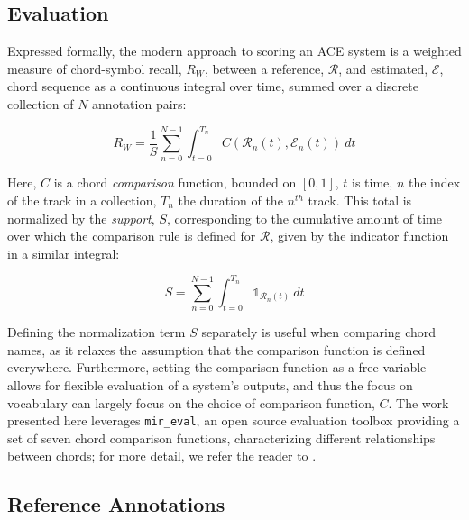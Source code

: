 \documentclass{article}
\begin{document}
\subsection{Evaluation}
\label{subsec:eval}

Expressed formally, the modern approach to scoring an ACE system is a weighted measure of chord-symbol recall, $R_{W}$, between a reference, $\mathcal{R}$, and estimated, $\mathcal{E}$, chord sequence as a continuous integral over time, summed over a discrete collection of $N$ annotation pairs:

\begin{equation}
\label{eq:recall_micro}
R_{W} = \frac{1}{S}\sum_{n=0}^{N-1}\int_{t=0}^{T_n}C(\mathcal{R}_n(t), \mathcal{E}_n(t))~dt
\end{equation}

\noindent Here, $C$ is a chord \emph{comparison} function, bounded on $[0, 1]$, $t$ is time, $n$ the index of the track in a collection, $T_n$ the duration of the $n^{th}$ track. This total is normalized by the \emph{support}, $S$, corresponding to the cumulative amount of time over which the comparison rule is defined for $\mathcal{R}$, given by the indicator function in a similar integral:

\begin{equation}
S = \sum_{n=0}^{N-1}\int_{t=0}^{T_n}\mathds{1}_{\mathcal{R}_n(t)}~dt
\end{equation}

Defining the normalization term $S$ separately is useful when comparing chord names, as it relaxes the assumption that the comparison function is defined everywhere.
Furthermore, setting the comparison function as a free variable allows for flexible evaluation of a system's outputs, and thus the focus on vocabulary can largely focus on the choice of comparison function, $C$.
The work presented here leverages \texttt{mir\_eval}, an open source evaluation toolbox providing a set of seven chord comparison functions, characterizing different relationships between chords;
for more detail, we refer the reader to \cite{Raffel2014Eval}.


\subsection{Reference Annotations}
\label{subsec:data}

\end{document}
